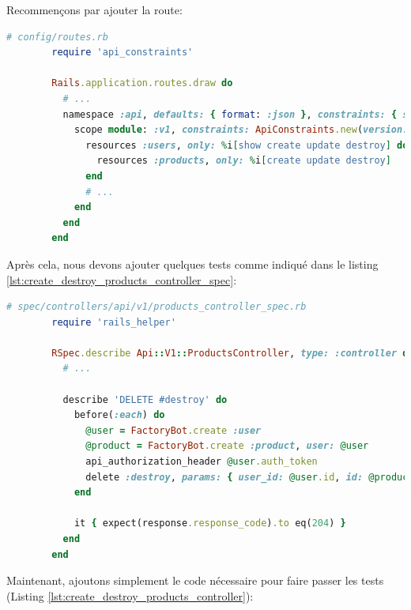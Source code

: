 \documentclass[]{report}
\begin{document}
      Recommençons par ajouter la route:

      \begin{scriptsize}
        \begin{lstlisting}[language=ruby]
        # config/routes.rb
        require 'api_constraints'

        Rails.application.routes.draw do
          # ...
          namespace :api, defaults: { format: :json }, constraints: { subdomain: 'api' }, path: '/' do
            scope module: :v1, constraints: ApiConstraints.new(version: 1, default: true) do
              resources :users, only: %i[show create update destroy] do
                resources :products, only: %i[create update destroy]
              end
              # ...
            end
          end
        end
        \end{lstlisting}
      \end{scriptsize}

      Après cela, nous devons ajouter quelques tests comme indiqué dans le listing \ref{lst:create_destroy_products_controller_spec}:

      \begin{scriptsize}
        \begin{lstlisting}[language=ruby, caption={Test de suppression des produits}, label={lst:create_destroy_products_controller_spec}]
        # spec/controllers/api/v1/products_controller_spec.rb
        require 'rails_helper'

        RSpec.describe Api::V1::ProductsController, type: :controller do
          # ...

          describe 'DELETE #destroy' do
            before(:each) do
              @user = FactoryBot.create :user
              @product = FactoryBot.create :product, user: @user
              api_authorization_header @user.auth_token
              delete :destroy, params: { user_id: @user.id, id: @product.id }
            end

            it { expect(response.response_code).to eq(204) }
          end
        end
        \end{lstlisting}
      \end{scriptsize}

      Maintenant, ajoutons simplement le code nécessaire pour faire passer les tests (Listing \ref{lst:create_destroy_products_controller}):
\end{document}
